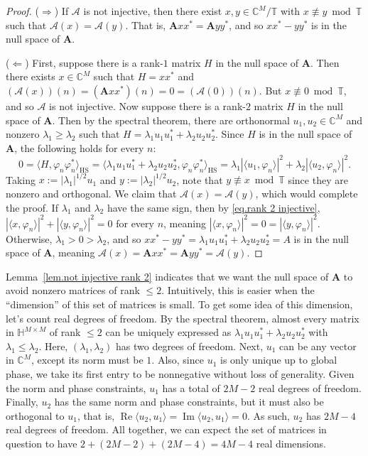 \documentclass[times,10pt]{elsarticle}
\theoremstyle{plain}
\begin{document}
\begin{proof}
($\Rightarrow$)
If $\mathcal{A}$ is not injective, then there exist $x,y\in\mathbb{C}^M/\mathbb{T}$ with $x\nequiv y\bmod\mathbb{T}$ such that $\mathcal{A}(x)=\mathcal{A}(y)$.
That is, $\mathbf{A}xx^*=\mathbf{A}yy^*$, and so $xx^*-yy^*$ is in the null space of $\mathbf{A}$.

($\Leftarrow$)
First, suppose there is a rank-$1$ matrix $H$ in the null space of $\mathbf{A}$.
Then there exists $x\in\mathbb{C}^M$ such that $H=xx^*$ and $(\mathcal{A}(x))(n)=(\mathbf{A}xx^*)(n)=0=(\mathcal{A}(0))(n)$.
But $x\not\equiv0\bmod\mathbb{T}$, and so $\mathcal{A}$ is not injective.
Now suppose there is a rank-$2$ matrix $H$ in the null space of $\mathbf{A}$.
Then by the spectral theorem, there are orthonormal $u_1,u_2\in\mathbb{C}^M$ and nonzero $\lambda_1\geq\lambda_2$ such that $H=\lambda_1u_1u_1^*+\lambda_2u_2u_2^*$.
Since $H$ is in the null space of $\mathbf{A}$, the following holds for every $n$:
\begin{equation}
\label{eq.rank 2 injective}
0
=\langle H,\varphi_n\varphi_n^*\rangle_\mathrm{HS}
=\langle \lambda_1u_1u_1^*+\lambda_2u_2u_2^*,\varphi_n\varphi_n^*\rangle_\mathrm{HS}
=\lambda_1|\langle u_1,\varphi_n\rangle|^2+\lambda_2|\langle u_2,\varphi_n\rangle|^2.
\end{equation}
Taking $x:=|\lambda_1|^{1/2}u_1$ and $y:=|\lambda_2|^{1/2}u_2$, note that $y\not\equiv x\bmod\mathbb{T}$ since they are nonzero and orthogonal.
We claim that $\mathcal{A}(x)=\mathcal{A}(y)$, which would complete the proof.
If $\lambda_1$ and $\lambda_2$ have the same sign, then by \eqref{eq.rank 2 injective}, $|\langle x,\varphi_n\rangle|^2+|\langle y,\varphi_n\rangle|^2=0$ for every $n$, meaning $|\langle x,\varphi_n\rangle|^2=0=|\langle y,\varphi_n\rangle|^2$.
Otherwise, $\lambda_1>0>\lambda_2$, and so $xx^*-yy^*=\lambda_1u_1u_1^*+\lambda_2u_2u_2^*=A$ is in the null space of $\mathbf{A}$, meaning $\mathcal{A}(x)=\mathbf{A}xx^*=\mathbf{A}yy^*=\mathcal{A}(y)$.
\qquad
\end{proof}

Lemma~\ref{lem.not injective rank 2} indicates that we want the null space of $\mathbf{A}$ to avoid nonzero matrices of rank $\leq 2$.
Intuitively, this is easier when the ``dimension'' of this set of matrices is small.
To get some idea of this dimension, let's count real degrees of freedom.
By the spectral theorem, almost every matrix in $\mathbb{H}^{M\times M}$ of rank $\leq 2$ can be uniquely expressed as $\lambda_1u_1u_1^*+\lambda_2u_2u_2^*$ with $\lambda_1\leq\lambda_2$.
Here, $(\lambda_1,\lambda_2)$ has two degrees of freedom.
Next, $u_1$ can be any vector in $\mathbb{C}^M$, except its norm must be $1$.
Also, since $u_1$ is only unique up to global phase, we take its first entry to be nonnegative without loss of generality.
Given the norm and phase constraints, $u_1$ has a total of $2M-2$ real degrees of freedom.
Finally, $u_2$ has the same norm and phase constraints, but it must also be orthogonal to $u_1$, that is, $\operatorname{Re}\langle u_2,u_1\rangle=\operatorname{Im}\langle u_2,u_1\rangle=0$.
As such, $u_2$ has $2M-4$ real degrees of freedom.
All together, we can expect the set of matrices in question to have $2+(2M-2)+(2M-4)=4M-4$ real dimensions.
\end{document}
